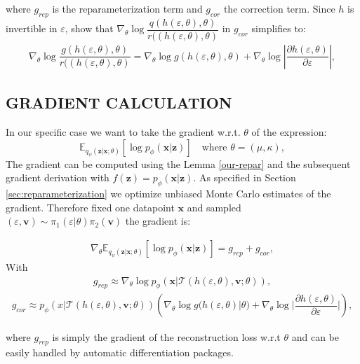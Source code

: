 \documentclass[letterpaper]{article}
\newcommand{\E}{\mathbb{E}}
\newcommand{\x}{\mathbf{x}}
\newcommand{\z}{\mathbf{z}}
\newcommand{\vv}{\mathbf{v}}
\begin{document}
where $g_{rep}$ is the reparameterization term and $g_{cor}$ the correction term.
Since $h$ is invertible in $\varepsilon$, \citet{rejection-repar} show that $\nabla_\theta \log \dfrac{q(h(\varepsilon, \theta), \theta)}{r((h(\varepsilon, \theta), \theta)}$ in $g_{cor}$ simplifies to:
\begin{align} \label{h-invert-simple}
    \nabla_\theta \log \dfrac{g(h(\varepsilon, \theta), \theta)}{r((h(\varepsilon, \theta), \theta)} = \nabla_\theta \log g(h(\varepsilon, \theta), \theta) + \nabla_\theta \log |\dfrac{\partial h(\varepsilon, \theta)}{\partial\varepsilon}|,
\end{align}

\subsection{GRADIENT CALCULATION}
In our specific case we want to take the gradient w.r.t. $\theta$ of the expression:
\begin{equation}
    \E_{ q_\psi(\z|\x; \theta)} [\log p_\phi(\x | \z)] \quad \text{where } \theta = {(\mu,\kappa)},
\end{equation}
The gradient can be computed using the Lemma \ref{our-repar} and the subsequent gradient derivation with $f(\z) = p_{\phi}(\x|\z)$. 
As specified in Section \ref{sec:reparameterization} we optimize unbiased Monte Carlo estimates of the gradient. Therefore fixed one datapoint $\x$ and sampled $(\varepsilon,\vv)\sim\pi_1(\varepsilon| \theta)\pi_2(\vv)$ the gradient is:

\begin{align}
    \nabla_\theta \E_{ q_\psi(\z|\x; \theta)} [\log p_\phi(\x | \z)] = g_{rep} + g_{cor},   
\end{align}
With
\begin{align}
g_{rep} \approx \nabla_{\theta} \log p_{\phi}\left(\x|\mathcal{T}(h(\varepsilon, \theta), \vv; \theta)\right),
\end{align}
\begin{align}
    g_{cor} \approx p_{\phi}\left(x|\mathcal{T}(h(\varepsilon, \theta), \vv; \theta)\right) \left( \nabla_\theta \log g(h(\varepsilon, \theta)| \theta) + \nabla_\theta \log |\dfrac{\partial h(\varepsilon, \theta)}{\partial\varepsilon}| \right),
\end{align}


where $g_{rep}$ is simply the gradient of the reconstruction loss w.r.t $\theta$ and can be easily handled by automatic differentiation packages. 
\end{document}
